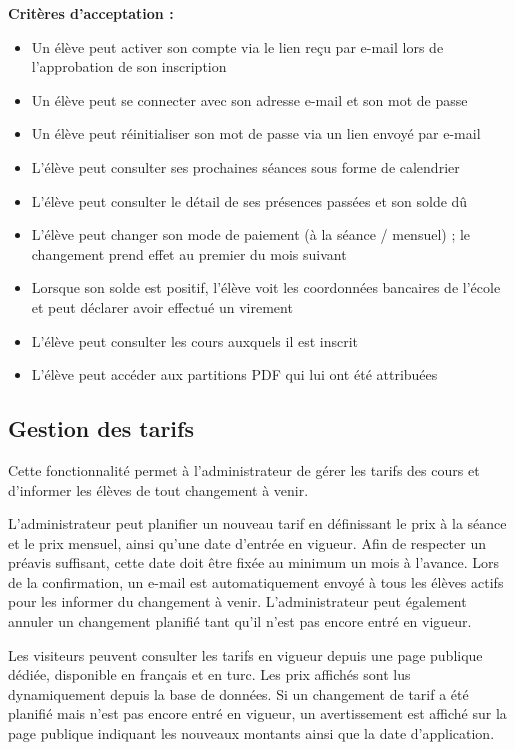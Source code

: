 \documentclass{article}
\begin{document}
\textbf{Critères d'acceptation :}
\begin{itemize}
    \item Un élève peut activer son compte via le lien reçu
    par e-mail lors de l'approbation de son inscription
    \item Un élève peut se connecter avec son adresse e-mail
    et son mot de passe
    \item Un élève peut réinitialiser son mot de passe via
    un lien envoyé par e-mail
    \item L'élève peut consulter ses prochaines séances
    sous forme de calendrier
    \item L'élève peut consulter le détail de ses présences
    passées et son solde dû
    \item L'élève peut changer son mode de paiement
    (à la séance / mensuel) ; le changement prend effet
    au premier du mois suivant
    \item Lorsque son solde est positif, l'élève voit les
    coordonnées bancaires de l'école et peut déclarer
    avoir effectué un virement
    \item L'élève peut consulter les cours auxquels il est inscrit
    \item L'élève peut accéder aux partitions PDF qui lui
    ont été attribuées
\end{itemize}

\subsection{Gestion des tarifs}

Cette fonctionnalité permet à l'administrateur de gérer les tarifs
des cours et d'informer les élèves de tout changement à venir.

L'administrateur peut planifier un nouveau tarif en définissant
le prix à la séance et le prix mensuel, ainsi qu'une date d'entrée
en vigueur. Afin de respecter un préavis suffisant, cette date doit
être fixée au minimum un mois à l'avance. Lors de la confirmation,
un e-mail est automatiquement envoyé à tous les élèves actifs pour
les informer du changement à venir. L'administrateur peut également
annuler un changement planifié tant qu'il n'est pas encore entré
en vigueur.

Les visiteurs peuvent consulter les tarifs en vigueur depuis une
page publique dédiée, disponible en français et en turc. Les prix
affichés sont lus dynamiquement depuis la base de données. Si un
changement de tarif a été planifié mais n'est pas encore entré en
vigueur, un avertissement est affiché sur la page publique indiquant
les nouveaux montants ainsi que la date d'application.
\end{document}
